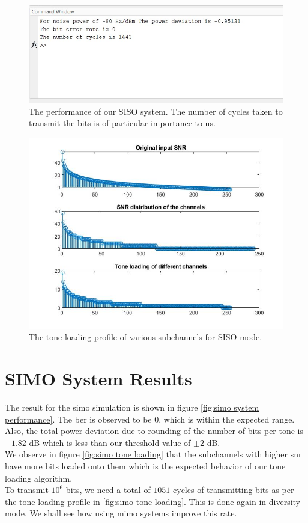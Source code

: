 \begin{figure}[!htbp]
\centering
\includegraphics[scale=1]{Chapter 4/Figures/SISO System Performance}
\caption[SISO Tone Loading]{The performance of our SISO system. The number of cycles taken to transmit the bits is of particular importance to us.}
\label{fig:siso system performance}
\end{figure}

\begin{figure}[!htbp]
\centering
\includegraphics[scale=0.7]{Chapter 4/Figures/SISO Tone Loading}
\caption[SISO Tone Loading]{The tone loading profile of various subchannels for SISO mode.}
\label{fig:siso tone loading}
\end{figure}

\section{SIMO System Results}
The result for the \acrshort{simo} simulation is shown in figure \ref{fig:simo system performance}. The \acrshort{ber} is observed to be $0$, which is within the expected range. Also, the total power deviation due to rounding of the number of bits per tone is $-1.82$ dB which is less than our threshold value of $\pm 2$ dB.\\
We observe in figure \ref{fig:simo tone loading} that the subchannels with higher \acrshort{snr} have more bits loaded onto them which is the expected behavior of our tone loading algorithm.\\
To transmit $10^6$ bits, we need a total of $1051$ cycles of transmitting bits as per the tone loading profile in \ref{fig:simo tone loading}. This is done again in diversity mode. We shall see how using \acrshort{mimo} systems improve this rate.


